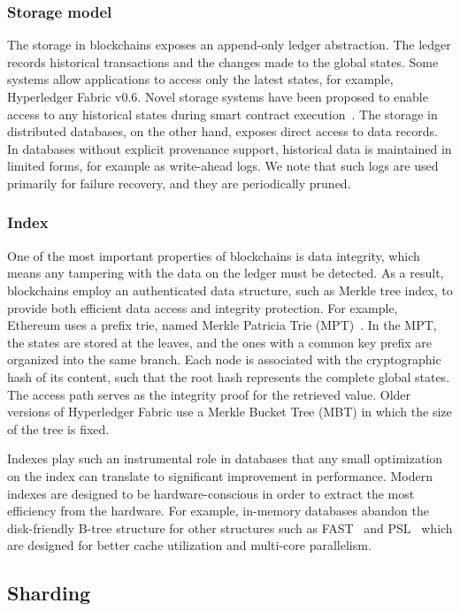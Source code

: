 \subsubsection{Storage model}
The storage in blockchains exposes an append-only ledger abstraction. The ledger records historical
transactions and the changes made to the global states. Some systems allow applications to access only
the latest states, for example, Hyperledger Fabric v0.6. Novel storage systems have been proposed to
enable access to any historical states during smart contract execution~\cite{ruan2019fine}. The storage in distributed databases, on the other hand, exposes direct access to data records. In databases without explicit provenance support, historical data is maintained in limited forms, for example as write-ahead logs.
We note that such logs are used primarily for failure recovery, and they are periodically pruned. 

\subsubsection{Index}
One of the most important properties of blockchains is data integrity, which means any tampering with the
data on the ledger must be detected. As a result, blockchains employ an authenticated data structure, such as Merkle tree index, to provide both efficient data access and integrity protection. For example, Ethereum uses a prefix trie, named Merkle
Patricia Trie (MPT)~\cite{web:mpt}. In the MPT, the states are stored at the leaves, and the ones with a common key
prefix are organized into the same branch. Each node is associated with the cryptographic hash of its
content, such that the root hash represents the complete global states. The access path serves as the
integrity proof for the retrieved value. Older versions of Hyperledger Fabric use a Merkle Bucket Tree (MBT)
in which the size of the tree is fixed. 

Indexes play such an instrumental role in databases that any small optimization on the index can translate
to significant improvement in performance. Modern indexes are designed to be hardware-conscious in order to
extract the most efficiency from the hardware. For example, in-memory databases abandon the disk-friendly B-tree
structure for other structures such as FAST~\cite{kim2010fast} and PSL~\cite{xie2017parallelizing} which
are designed for better cache utilization and multi-core parallelism.


\subsection{Sharding}

